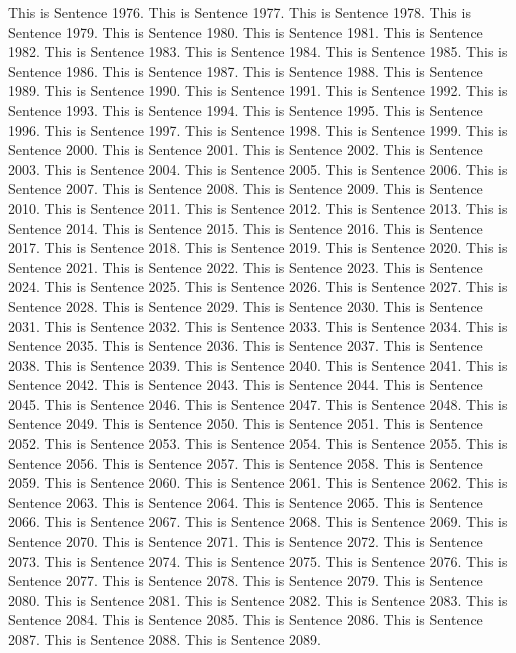\documentclass{article}
\begin{document}
This is Sentence 1976.
This is Sentence 1977.
This is Sentence 1978.
This is Sentence 1979.
This is Sentence 1980.
This is Sentence 1981.
This is Sentence 1982.
This is Sentence 1983.
This is Sentence 1984.
This is Sentence 1985.
This is Sentence 1986.
This is Sentence 1987.
This is Sentence 1988.
This is Sentence 1989.
This is Sentence 1990.
This is Sentence 1991.
This is Sentence 1992.
This is Sentence 1993.
This is Sentence 1994.
This is Sentence 1995.
This is Sentence 1996.
This is Sentence 1997.
This is Sentence 1998.
This is Sentence 1999.
This is Sentence 2000.
This is Sentence 2001.
This is Sentence 2002.
This is Sentence 2003.
This is Sentence 2004.
This is Sentence 2005.
This is Sentence 2006.
This is Sentence 2007.
This is Sentence 2008.
This is Sentence 2009.
This is Sentence 2010.
This is Sentence 2011.
This is Sentence 2012.
This is Sentence 2013.
This is Sentence 2014.
This is Sentence 2015.
This is Sentence 2016.
This is Sentence 2017.
This is Sentence 2018.
This is Sentence 2019.
This is Sentence 2020.
This is Sentence 2021.
This is Sentence 2022.
This is Sentence 2023.
This is Sentence 2024.
This is Sentence 2025.
This is Sentence 2026.
This is Sentence 2027.
This is Sentence 2028.
This is Sentence 2029.
This is Sentence 2030.
This is Sentence 2031.
This is Sentence 2032.
This is Sentence 2033.
This is Sentence 2034.
This is Sentence 2035.
This is Sentence 2036.
This is Sentence 2037.
This is Sentence 2038.
This is Sentence 2039.
This is Sentence 2040.
This is Sentence 2041.
This is Sentence 2042.
This is Sentence 2043.
This is Sentence 2044.
This is Sentence 2045.
This is Sentence 2046.
This is Sentence 2047.
This is Sentence 2048.
This is Sentence 2049.
This is Sentence 2050.
This is Sentence 2051.
This is Sentence 2052.
This is Sentence 2053.
This is Sentence 2054.
This is Sentence 2055.
This is Sentence 2056.
This is Sentence 2057.
This is Sentence 2058.
This is Sentence 2059.
This is Sentence 2060.
This is Sentence 2061.
This is Sentence 2062.
This is Sentence 2063.
This is Sentence 2064.
This is Sentence 2065.
This is Sentence 2066.
This is Sentence 2067.
This is Sentence 2068.
This is Sentence 2069.
This is Sentence 2070.
This is Sentence 2071.
This is Sentence 2072.
This is Sentence 2073.
This is Sentence 2074.
This is Sentence 2075.
This is Sentence 2076.
This is Sentence 2077.
This is Sentence 2078.
This is Sentence 2079.
This is Sentence 2080.
This is Sentence 2081.
This is Sentence 2082.
This is Sentence 2083.
This is Sentence 2084.
This is Sentence 2085.
This is Sentence 2086.
This is Sentence 2087.
This is Sentence 2088.
This is Sentence 2089.
\end{document}
